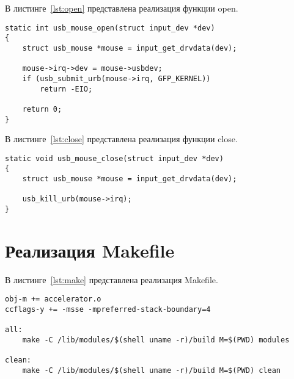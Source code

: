 В листинге~\ref{lst:open} представлена реализация функции open.
\begin{lstlisting}[label=lst:open, caption=Реализация функции open]
static int usb_mouse_open(struct input_dev *dev)
{
	struct usb_mouse *mouse = input_get_drvdata(dev);
	
	mouse->irq->dev = mouse->usbdev;
	if (usb_submit_urb(mouse->irq, GFP_KERNEL))
		return -EIO;
	
	return 0;
}
\end{lstlisting}

В листинге~\ref{lst:close} представлена реализация функции close.
\begin{lstlisting}[label=lst:close, caption=Реализация функции close]
static void usb_mouse_close(struct input_dev *dev)
{
	struct usb_mouse *mouse = input_get_drvdata(dev);
	
	usb_kill_urb(mouse->irq);
}
\end{lstlisting}

\section{Реализация Makefile}

В листинге~\ref{lst:make} представлена реализация Makefile.
\begin{lstlisting}[label=lst:make, caption=Реализация Makefile]
obj-m += accelerator.o
ccflags-y += -msse -mpreferred-stack-boundary=4

all:
	make -C /lib/modules/$(shell uname -r)/build M=$(PWD) modules

clean:
	make -C /lib/modules/$(shell uname -r)/build M=$(PWD) clean
\end{lstlisting}